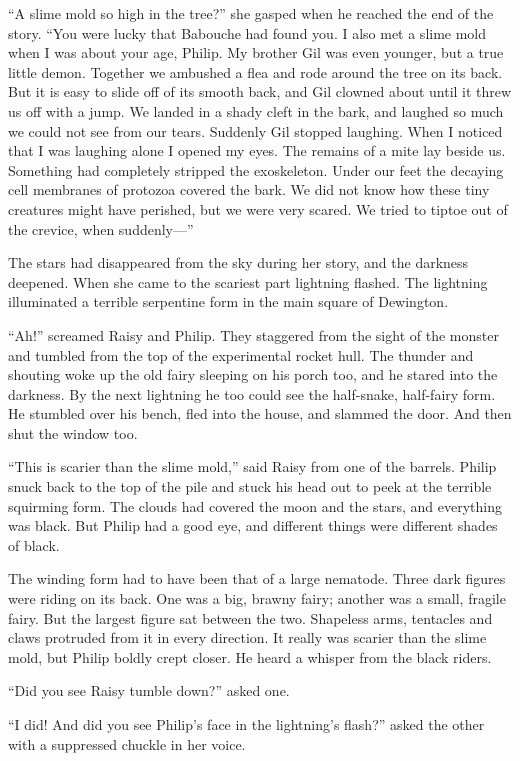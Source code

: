 \documentclass[10pt, draft]{memoir}
\begin{document}
``A slime mold so high in the tree?'' she gasped when he reached the end of the story. ``You were lucky that Babouche had found you. I also met a slime mold when I was about your age, Philip. My brother Gil was even younger, but a true little demon. Together we ambushed a flea and rode around the tree on its back. But it is easy to slide off of its smooth back, and Gil clowned about until it threw us off with a jump. We landed in a shady cleft in the bark, and laughed so much we could not see from our tears. Suddenly Gil stopped laughing. When I noticed that I was laughing alone I opened my eyes. The remains of a mite lay beside us. Something had completely stripped the exoskeleton. Under our feet the decaying cell membranes of protozoa covered the bark. We did not know how these tiny creatures might have perished, but we were very scared. We tried to tiptoe out of the crevice, when suddenly---''

The stars had disappeared from the sky during her story, and the darkness deepened. When she came to the scariest part lightning flashed. The lightning illuminated a terrible serpentine form in the main square of Dewington.

``Ah!'' screamed Raisy and Philip. They staggered from the sight of the monster and tumbled from the top of the experimental rocket hull. The thunder and shouting woke up the old fairy sleeping on his porch too, and he stared into the darkness. By the next lightning he too could see the half-snake, half-fairy form. He stumbled over his bench, fled into the house, and slammed the door. And then shut the window too.

``This is scarier than the slime mold,'' said Raisy from one of the barrels. Philip snuck back to the top of the pile and stuck his head out to peek at the terrible squirming form. The clouds had covered the moon and the stars, and everything was black. But Philip had a good eye, and different things were different shades of black.

The winding form had to have been that of a large nematode. Three dark figures were riding on its back. One was a big, brawny fairy; another was a small, fragile fairy. But the largest figure sat between the two. Shapeless arms, tentacles and claws protruded from it in every direction. It really was scarier than the slime mold, but Philip boldly crept closer. He heard a whisper from the black riders.

``Did you see Raisy tumble down?'' asked one.

``I did! And did you see Philip's face in the lightning's flash?'' asked the other with a suppressed chuckle in her voice.
\end{document}

